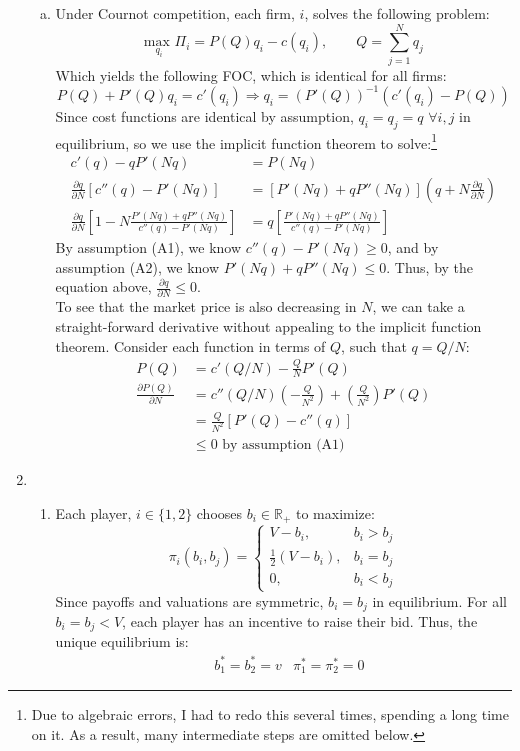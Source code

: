 \documentclass{article}
\newcommand{\R}{\mathbb{R}}
\newcommand{\usmax}[1]{\underset{#1}{\text{max }}}
\newcommand{\pl}{\partial}
\begin{document}
\begin{enumerate}
\begin{enumerate}[(a)]
    \item Under Cournot competition, each firm, $i$, solves the following problem:
    \[
      \usmax{q_i}\Pi_i = P(Q)q_i - c(q_i),\quad\quad Q = \sum_{j=1}^N q_j
    \]
    Which yields the following FOC, which is identical for all firms:
    \[
      P(Q) + P'(Q)q_i = c'(q_i)\Rightarrow q_i = \left(P'(Q)\right)^{-1}\left(c'(q_i) - P(Q)\right)
    \]
    Since cost functions are identical by assumption, $q_i=q_j=q$ $\forall i,j$ in equilibrium, so we use the implicit function theorem to solve:\footnote{Due to algebraic errors, I had to redo this several times, spending a long time on it. As a result, many intermediate steps are omitted below.}
    \begin{align*}
        c'(q) - qP'(Nq) &= P(Nq)    \\
        \frac{\pl q}{\pl N}\left[c''(q)-P'(Nq)\right] &= \left[P'(Nq) + qP''(Nq)\right]\left(q + N\frac{\pl q}{\pl N}\right)   \\
        \frac{\pl q}{\pl N}\left[1-N\frac{P'(Nq) + qP''(Nq)}{c''(q)-P'(Nq)}\right] &= q\left[\frac{P'(Nq) + qP''(Nq)}{c''(q)-P'(Nq)}\right]
    \end{align*}
    By assumption (A1), we know $c''(q)-P'(Nq)\geq 0$, and by assumption (A2), we know ${P'(Nq)+qP''(Nq)\leq 0}$. Thus, by the equation above, $\frac{\pl q}{\pl N}\leq 0$. \medskip \\
    To see that the market price is also decreasing in $N$, we can take a straight-forward derivative without appealing to the implicit function theorem. Consider each function in terms of $Q$, such that ${q=Q/N}$:\begin{align*}
      P(Q)                    &= c'(Q/N) - \frac{Q}{N}P'(Q)                                             \\
      \frac{\pl P(Q)}{\pl N}  &= c''(Q/N)\left(-\frac{Q}{N^2}\right) + \left(\frac{Q}{N^2}\right)P'(Q)  \\
                              &= \frac{Q}{N^2}\left[P'(Q) - c''(q)\right]                               \\
                              &\leq 0\text{ by assumption (A1)}
    \end{align*}
  \end{enumerate}

  \item  
  \begin{enumerate}
    \item Each player, $i\in\{1,2\}$ chooses $b_i\in\R_+$ to maximize: \[
      \pi_i(b_i,b_j) = \begin{cases}
        V-b_i,&b_i>b_j  \\
        \frac{1}{2}\left(V-b_i\right),&b_i=b_j \\
        0,&b_i<b_j
      \end{cases}
    \]
    Since payoffs and valuations are symmetric, $b_i=b_j$ in equilibrium. For all $b_i=b_j<V$, each player has an incentive to raise their bid. Thus, the unique equilibrium is:
    \begin{align*}
      &b_1^*=b_2^*=v & \pi_1^*=\pi_2^*=0
    \end{align*}


\end{enumerate}
\end{enumerate}
\end{document}
